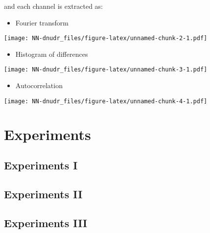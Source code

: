 \documentclass[]{article}
\providecommand{\tightlist}{%
  \setlength{\itemsep}{0pt}\setlength{\parskip}{0pt}}
\begin{document}
and each channel is extracted as:

\begin{itemize}
\tightlist
\item
  Fourier transform
\end{itemize}

\texttt{[image: NN-dnudr\_files/figure-latex/unnamed-chunk-2-1.pdf]}

\begin{itemize}
\tightlist
\item
  Histogram of differences
\end{itemize}

\texttt{[image: NN-dnudr\_files/figure-latex/unnamed-chunk-3-1.pdf]}

\begin{itemize}
\tightlist
\item
  Autocorrelation
\end{itemize}

\texttt{[image: NN-dnudr\_files/figure-latex/unnamed-chunk-4-1.pdf]}

\section{Experiments}\label{experiments}

\subsection{Experiments I}\label{experiments-i}

\subsection{Experiments II}\label{experiments-ii}

\subsection{Experiments III}\label{experiments-iii}
\end{document}
